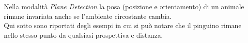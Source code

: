 \documentclass[crop=false, class=book]{standalone}
\begin{document}
	\begin{flushleft}
		Nella modalità \emph{Plane Detection} la posa (posizione e orientamento) di un animale rimane invariata anche se 				l'ambiente circostante cambia.\\
		Qui sotto sono riportati degli esempi in cui si può notare che il pinguino rimane nello stesso punto da qualsiasi 				prospettiva e distanza.
	\end{flushleft}
	
	\begin{figure}
			\centering
\end{figure}
\end{document}

